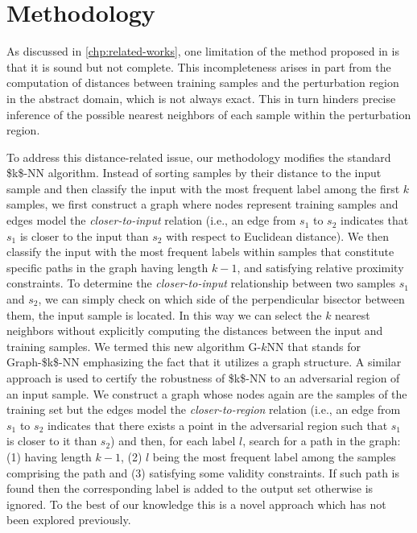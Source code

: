 
\chapter{Methodology}
\label{chp:methodology}

As discussed in \autoref{chp:related-works}, one limitation of the method proposed in \cite{Nicolo-knn} is that it is sound but not complete. This incompleteness arises in part from the computation of distances between training samples and the perturbation region in the abstract domain, which is not always exact. This in turn hinders precise inference of the possible nearest neighbors of each sample within the perturbation region.

To address this distance-related issue, our methodology modifies the standard \acs{$k$-NN} algorithm. Instead of sorting samples by their distance to the input sample and then classify the input with the most frequent label among the first $k$ samples, we first construct a graph where nodes represent training samples and edges model the \emph{closer-to-input} relation (i.e., an edge from $s_1$ to $s_2$ indicates that $s_1$ is closer to the input than $s_2$ with respect to Euclidean distance). We then classify the input with the most frequent labels within samples that constitute specific paths in the graph having length $k-1$, and satisfying relative proximity constraints. To determine the \emph{closer-to-input} relationship between two samples $s_1$ and $s_2$, we can simply check on which side of the perpendicular bisector between them, the input sample is located. In this way we can select the $k$ nearest neighbors without explicitly computing the distances between the input and training samples. We termed this new algorithm G-$k$NN that stands for Graph-\acs{$k$-NN} emphasizing the fact that it utilizes a graph structure. A similar approach is used to certify the robustness of \acs{$k$-NN} to an adversarial region of an input sample. We construct a graph whose nodes again are the samples of the training set but the edges model the \emph{closer-to-region} relation (i.e., an edge from $s_1$ to $s_2$ indicates that there exists a point in the adversarial region such that $s_1$ is closer to it than $s_2$) and then, for each label $l$, search for a path in the graph: (1) having length $k-1$, (2) $l$ being the most frequent label among the samples comprising the path and (3) satisfying some validity constraints. If such path is found then the corresponding label is added to the output set otherwise is ignored. To the best of our knowledge this is a novel approach which has not been explored previously.

